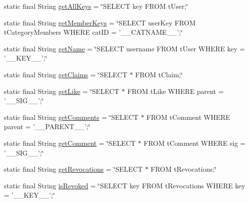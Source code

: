 \begin{DoxyCompactItemize}
\item 
static final String \hyperlink{classballmerpeak_1_1turtlenet_1_1server_1_1DBStrings_a421524524ae9aecc5f05c4a087a8a3b9}{get\-All\-Keys} = \char`\"{}S\-E\-L\-E\-C\-T key F\-R\-O\-M t\-User;\char`\"{}
\item 
static final String \hyperlink{classballmerpeak_1_1turtlenet_1_1server_1_1DBStrings_af52ab80c3167b21dd0b8c7c61e498e61}{get\-Member\-Keys} = \char`\"{}S\-E\-L\-E\-C\-T user\-Key F\-R\-O\-M t\-Category\-Members W\-H\-E\-R\-E cat\-I\-D = '\-\_\-\-\_\-\-C\-A\-T\-N\-A\-M\-E\-\_\-\-\_\-';\char`\"{}
\item 
static final String \hyperlink{classballmerpeak_1_1turtlenet_1_1server_1_1DBStrings_a1a166aed33e92e5a9990201b6d426e07}{get\-Name} = \char`\"{}S\-E\-L\-E\-C\-T username F\-R\-O\-M t\-User W\-H\-E\-R\-E key = '\-\_\-\-\_\-\-K\-E\-Y\-\_\-\-\_\-';\char`\"{}
\item 
static final String \hyperlink{classballmerpeak_1_1turtlenet_1_1server_1_1DBStrings_a18809032ae6a521a9293b4f4e8cfa5f4}{get\-Claims} = \char`\"{}S\-E\-L\-E\-C\-T $\ast$ F\-R\-O\-M t\-Claim;\char`\"{}
\item 
static final String \hyperlink{classballmerpeak_1_1turtlenet_1_1server_1_1DBStrings_ae351265e633b120e4897cf92f17d3018}{get\-Like} = \char`\"{}S\-E\-L\-E\-C\-T $\ast$ F\-R\-O\-M t\-Like W\-H\-E\-R\-E parent = '\-\_\-\-\_\-\-S\-I\-G\-\_\-\-\_\-';\char`\"{}
\item 
static final String \hyperlink{classballmerpeak_1_1turtlenet_1_1server_1_1DBStrings_a1576b88412e7eac8188422b2f9945cd4}{get\-Comments} = \char`\"{}S\-E\-L\-E\-C\-T $\ast$ F\-R\-O\-M t\-Comment W\-H\-E\-R\-E parent = '\-\_\-\-\_\-\-P\-A\-R\-E\-N\-T\-\_\-\-\_\-';\char`\"{}
\item 
static final String \hyperlink{classballmerpeak_1_1turtlenet_1_1server_1_1DBStrings_a5584702225a961d74dc35ee4660c136e}{get\-Comment} = \char`\"{}S\-E\-L\-E\-C\-T $\ast$ F\-R\-O\-M t\-Comment W\-H\-E\-R\-E sig = '\-\_\-\-\_\-\-S\-I\-G\-\_\-\-\_\-';\char`\"{}
\item 
static final String \hyperlink{classballmerpeak_1_1turtlenet_1_1server_1_1DBStrings_a8dc5636da5576be650e1de5c08109bc8}{get\-Revocations} = \char`\"{}S\-E\-L\-E\-C\-T $\ast$ F\-R\-O\-M t\-Revocations;\char`\"{}
\item 
static final String \hyperlink{classballmerpeak_1_1turtlenet_1_1server_1_1DBStrings_a18c48137c57f21cff5ba853fbf5f524f}{is\-Revoked} = \char`\"{}S\-E\-L\-E\-C\-T key F\-R\-O\-M t\-Revocations W\-H\-E\-R\-E key = '\-\_\-\-\_\-\-K\-E\-Y\-\_\-\-\_\-';\char`\"{}

\end{DoxyCompactItemize}
